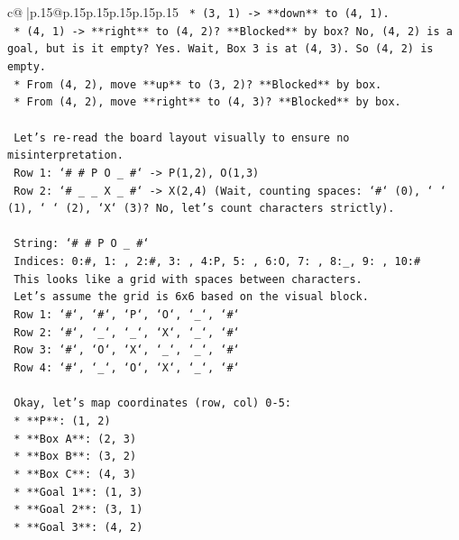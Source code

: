 \documentclass{article}
\begin{document}
{\begin{supertabular}{c@{$\;$}|p{.15\linewidth}@{}p{.15\linewidth}p{.15\linewidth}p{.15\linewidth}p{.15\linewidth}p{.15\linewidth}}
{{{\texttt{        *   (3, 1) {-}> **down** to (4, 1).} \\
\texttt{        *   (4, 1) {-}> **right** to (4, 2)? **Blocked** by box? No, (4, 2) is a goal, but is it empty? Yes. Wait, Box 3 is at (4, 3). So (4, 2) is empty.} \\
\texttt{        *   From (4, 2), move **up** to (3, 2)? **Blocked** by box.} \\
\texttt{        *   From (4, 2), move **right** to (4, 3)? **Blocked** by box.} \\
\\ 
\texttt{    Let's re{-}read the board layout visually to ensure no misinterpretation.} \\
\texttt{    Row 1: `\# \# P O \_ \#` {-}> P(1,2), O(1,3)} \\
\texttt{    Row 2: `\# \_ \_ X \_ \#` {-}> X(2,4) (Wait, counting spaces: `\#` (0), ` ` (1), ` ` (2), `X` (3)? No, let's count characters strictly).} \\
\\ 
\texttt{    String: `\# \# P O \_ \#`} \\
\texttt{    Indices: 0:\#, 1: , 2:\#, 3: , 4:P, 5: , 6:O, 7: , 8:\_, 9: , 10:\#} \\
\texttt{    This looks like a grid with spaces between characters.} \\
\texttt{    Let's assume the grid is 6x6 based on the visual block.} \\
\texttt{    Row 1: `\#`, `\#`, `P`, `O`, `\_`, `\#`} \\
\texttt{    Row 2: `\#`, `\_`, `\_`, `X`, `\_`, `\#`} \\
\texttt{    Row 3: `\#`, `O`, `X`, `\_`, `\_`, `\#`} \\
\texttt{    Row 4: `\#`, `\_`, `O`, `X`, `\_`, `\#`} \\
\\ 
\texttt{    Okay, let's map coordinates (row, col) 0{-}5:} \\
\texttt{    *   **P**: (1, 2)} \\
\texttt{    *   **Box A**: (2, 3)} \\
\texttt{    *   **Box B**: (3, 2)} \\
\texttt{    *   **Box C**: (4, 3)} \\
\texttt{    *   **Goal 1**: (1, 3)} \\
\texttt{    *   **Goal 2**: (3, 1)} \\
\texttt{    *   **Goal 3**: (4, 2)} \\
\\ 
}}}
\end{supertabular}}
\end{document}
